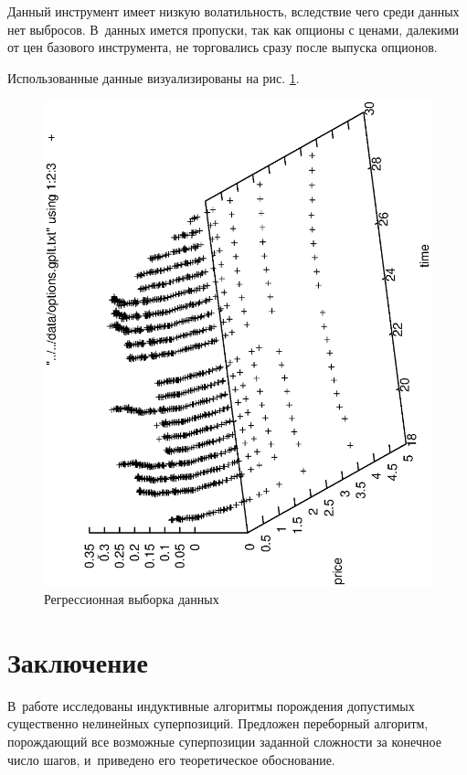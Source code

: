 \documentclass[12pt,a4paper]{amsart}
\begin{document}
Данный инструмент имеет низкую волатильность, вследствие чего среди данных
нет выбросов. В~данных имется пропуски, так как опционы с ценами, далекими
от цен базового инструмента, не торговались сразу после выпуска опционов.

Использованные данные визуализированы на рис. \ref{fig:raw_data_1}.

\begin{figure}[h]
  \includegraphics[scale=0.75,angle=-90]{figs/raw_data_1.eps}
  \caption{Регрессионная выборка данных}
  \label{fig:raw_data_1}
\end{figure}

\section{Заключение}

В~работе исследованы индуктивные алгоритмы порождения допустимых существенно
нелинейных суперпозиций. Предложен переборный алгоритм, порождающий все
возможные суперпозиции заданной сложности за конечное число шагов, и~приведено
его теоретическое обоснование. 
\end{document}
